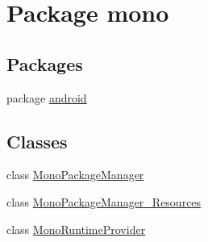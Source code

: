 \hypertarget{namespacemono}{
\section{Package mono}
\label{namespacemono}
}
\subsection*{Packages}
\begin{CompactItemize}
\item 
package \hyperlink{namespacemono_1_1android}{android}
\end{CompactItemize}
\subsection*{Classes}
\begin{CompactItemize}
\item 
class \hyperlink{classmono_1_1_mono_package_manager}{MonoPackageManager}
\item 
class \hyperlink{classmono_1_1_mono_package_manager___resources}{MonoPackageManager\_\-Resources}
\item 
class \hyperlink{classmono_1_1_mono_runtime_provider}{MonoRuntimeProvider}
\end{CompactItemize}
